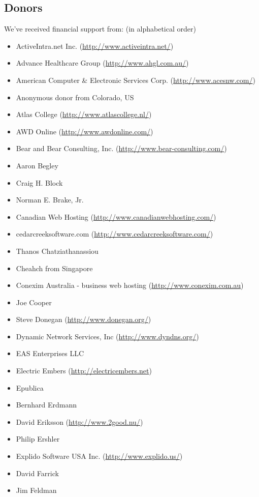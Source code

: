 \documentclass[a4paper,titlepage,12pt]{article}
\begin{document}
    \subsection{Donors}
    We've received financial support from: (in alphabetical order)
    \begin{itemize}
	\item ActiveIntra.net Inc. (\url{http://www.activeintra.net/})
	\item Advance Healthcare Group (\url{http://www.ahgl.com.au/})
	\item American Computer \& Electronic Services Corp. (\url{http://www.acesnw.com/})
	\item Anonymous donor from Colorado, US
	\item Atlas College (\url{http://www.atlascollege.nl/})
	\item AWD Online (\url{http://www.awdonline.com/})
	\item Bear and Bear Consulting, Inc. (\url{http://www.bear-consulting.com/})
	\item Aaron Begley
	\item Craig H. Block
	\item Norman E. Brake, Jr.
	\item Canadian Web Hosting (\url{http://www.canadianwebhosting.com/})
	\item cedarcreeksoftware.com (\url{http://www.cedarcreeksoftware.com/})
	\item Thanos Chatziathanassiou
	\item Cheahch from Singapore
	\item Conexim Australia - business web hosting (\url{http://www.conexim.com.au})
	\item Joe Cooper
	\item Steve Donegan (\url{http://www.donegan.org/})
	\item Dynamic Network Services, Inc (\url{http://www.dyndns.org/})
	\item EAS Enterprises LLC
	\item Electric Embers (\url{http://electricembers.net})
	\item Epublica
	\item Bernhard Erdmann
	\item David Eriksson (\url{http://www.2good.nu/})
	\item Philip Ershler
	\item Explido Software USA Inc. (\url{http://www.explido.us/})
	\item David Farrick
	\item Jim Feldman

\end{itemize}
\end{document}
